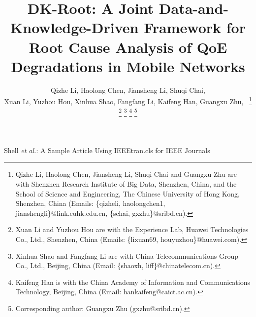 \documentclass[lettersize,journal]{IEEEtran}
\begin{document}
\title{DK-Root: A Joint Data-and-Knowledge-Driven Framework for Root Cause Analysis of QoE Degradations in Mobile Networks}

\author{Qizhe Li, Haolong Chen, Jiansheng Li, Shuqi Chai, \\
Xuan Li, Yuzhou Hou, Xinhua Shao, Fangfang Li, Kaifeng Han, Guangxu Zhu,~%
\thanks{Qizhe Li, Haolong Chen, Jiansheng Li, Shuqi Chai and Guangxu Zhu are with Shenzhen Research Institute of Big Data, Shenzhen, China, and the School of Science and Engineering, The Chinese University of Hong Kong, Shenzhen, China (Emails: \{qizheli, haolongchen1, jianshengli\}@link.cuhk.edu.cn, \{schai, gxzhu\}@sribd.cn).}%
\thanks{Xuan Li and Yuzhou Hou are with the Experience Lab, Huawei Technologies Co., Ltd., Shenzhen, China (Emails: \{lixuan69, houyuzhou\}@huawei.com).}%
\thanks{Xinhua Shao and Fangfang Li are with China Telecommunications Group Co., Ltd., Beijing, China (Email: \{shaoxh, liff\}@chinatelecom.cn).}%
\thanks{Kaifeng Han is with the China Academy of Information and Communications Technology, Beijing, China (Email: hankaifeng@caict.ac.cn).}%
\thanks{Corresponding author: Guangxu Zhu (gxzhu@sribd.cn).}%
}

%
{Shell \MakeLowercase{\textit{et al.}}: A Sample Article Using IEEEtran.cls for IEEE Journals}


\maketitle
\end{document}
